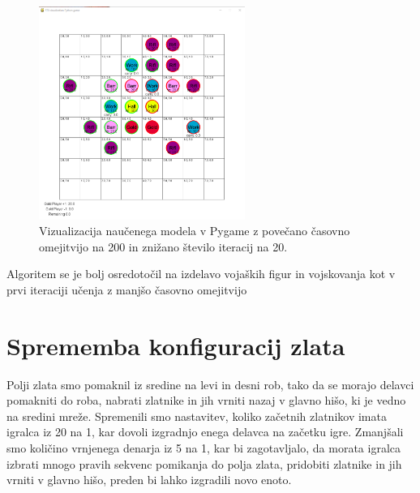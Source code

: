 \documentclass[a4paper, 12pt]{book}
\begin{document}
\begin{figure}[h]
	\begin{center}
		\includegraphics[width=0.6\textwidth]{photos/second-2018-11-12.pdf}
	\end{center}
	\caption{Vizualizacija naučenega modela v Pygame z povečano časovno omejitvijo  na 200 in znižano število iteracij na 20.}
	\label{vizualizacijaRezultatov200timeout20Iters}
\end{figure}

Algoritem se je bolj osredotočil na izdelavo vojaških figur in vojskovanja kot v prvi iteraciji učenja z manjšo časovno omejitvijo


\section{Sprememba konfiguracij zlata}
\label{resultThird}

Polji zlata smo pomaknil iz sredine na levi in desni rob, tako da se morajo delavci pomakniti do roba, nabrati zlatnike in jih vrniti nazaj v glavno hišo, ki je vedno na sredini mreže.
Spremenili smo nastavitev, koliko začetnih zlatnikov imata igralca iz 20 na 1, kar dovoli izgradnjo enega delavca na začetku igre.
Zmanjšali smo količino vrnjenega denarja iz 5 na 1, kar bi zagotavljalo, da morata igralca izbrati mnogo pravih sekvenc pomikanja do polja zlata, pridobiti zlatnike in jih vrniti v glavno hišo, preden bi lahko izgradili novo enoto.
\end{document}
